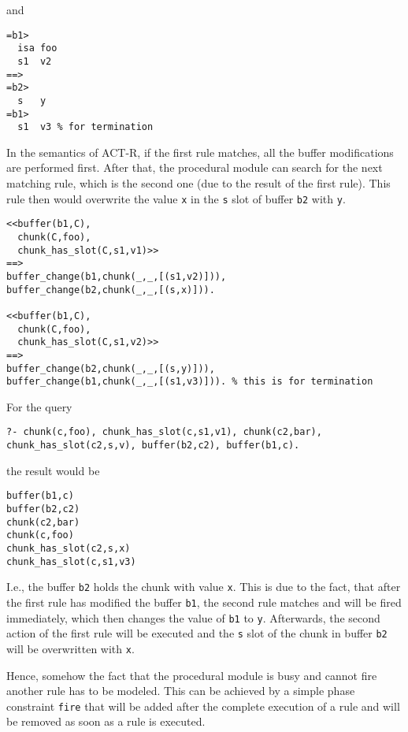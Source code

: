 and

\begin{lstlisting}
=b1>
  isa foo
  s1  v2
==>
=b2>
  s   y
=b1>
  s1  v3 % for termination
\end{lstlisting}

In the semantics of ACT-R, if the first rule matches, all the buffer modifications are performed first. After that, the procedural module can search for the next matching rule, which is the second one (due to the result of the first rule). This rule then would overwrite the value \lstinline|x| in the \lstinline|s| slot of buffer \lstinline|b2| with \lstinline|y|.

\begin{lstlisting}
<<buffer(b1,C),
  chunk(C,foo),
  chunk_has_slot(C,s1,v1)>>
==>
buffer_change(b1,chunk(_,_,[(s1,v2)])),
buffer_change(b2,chunk(_,_,[(s,x)])).

<<buffer(b1,C),
  chunk(C,foo),
  chunk_has_slot(C,s1,v2)>>
==>
buffer_change(b2,chunk(_,_,[(s,y)])),
buffer_change(b1,chunk(_,_,[(s1,v3)])). % this is for termination
\end{lstlisting}

For the query

\begin{lstlisting}
?- chunk(c,foo), chunk_has_slot(c,s1,v1), chunk(c2,bar), chunk_has_slot(c2,s,v), buffer(b2,c2), buffer(b1,c).
\end{lstlisting}

the result would be

\begin{lstlisting}
buffer(b1,c)
buffer(b2,c2)
chunk(c2,bar)
chunk(c,foo)
chunk_has_slot(c2,s,x)
chunk_has_slot(c,s1,v3)
\end{lstlisting}

I.e., the buffer \lstinline|b2| holds the chunk with value \lstinline|x|. This is due to the fact, that after the first rule has modified the buffer \lstinline|b1|, the second rule matches and will be fired immediately, which then changes the value of \lstinline|b1| to \lstinline|y|. Afterwards, the second action of the first rule will be executed and the \lstinline|s| slot of the chunk in buffer \lstinline|b2| will be overwritten with \lstinline|x|.

Hence, somehow the fact that the procedural module is busy and cannot fire another rule has to be modeled. This can be achieved by a simple phase constraint \lstinline|fire| that will be added after the complete execution of a rule and will be removed as soon as a rule is executed.

